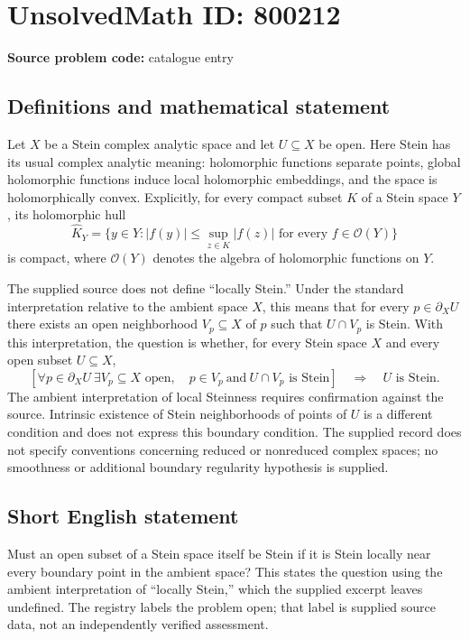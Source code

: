 \documentclass[11pt]{article}
\begin{document}
\section*{UnsolvedMath ID: 800212}
\textbf{Source problem code:} catalogue entry
\subsection{Definitions and mathematical statement}
Let \(X\) be a Stein complex analytic space and let \(U\subseteq X\) be open. Here Stein has its usual complex analytic meaning: holomorphic functions separate points, global holomorphic functions induce local holomorphic embeddings, and the space is holomorphically convex. Explicitly, for every compact subset \(K\) of a Stein space \(Y\), its holomorphic hull
\[
\widehat K_Y=\{y\in Y: |f(y)|\leq \sup_{z\in K}|f(z)|\text{ for every }f\in\mathcal O(Y)\}
\]
is compact, where \(\mathcal O(Y)\) denotes the algebra of holomorphic functions on \(Y\).

The supplied source does not define ``locally Stein.'' Under the standard interpretation relative to the ambient space \(X\), this means that for every \(p\in\partial_X U\) there exists an open neighborhood \(V_p\subseteq X\) of \(p\) such that \(U\cap V_p\) is Stein. With this interpretation, the question is whether, for every Stein space \(X\) and every open subset \(U\subseteq X\),
\[
\left[\forall p\in\partial_X U\ \exists V_p\subseteq X\text{ open},\quad p\in V_p\ \text{and}\ U\cap V_p\text{ is Stein}\right]
\quad\Longrightarrow\quad U\text{ is Stein}.
\]
The ambient interpretation of local Steinness requires confirmation against the source. Intrinsic existence of Stein neighborhoods of points of \(U\) is a different condition and does not express this boundary condition. The supplied record does not specify conventions concerning reduced or nonreduced complex spaces; no smoothness or additional boundary regularity hypothesis is supplied.
\subsection{Short English statement}
Must an open subset of a Stein space itself be Stein if it is Stein locally near every boundary point in the ambient space? This states the question using the ambient interpretation of ``locally Stein,'' which the supplied excerpt leaves undefined. The registry labels the problem open; that label is supplied source data, not an independently verified assessment.
\end{document}
